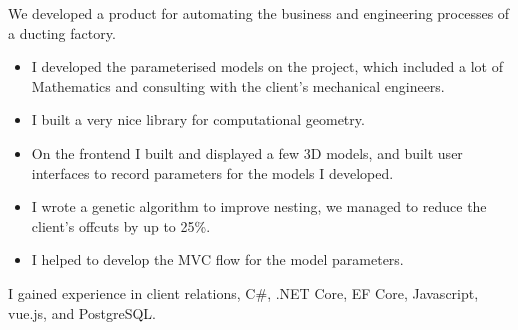 \documentclass[a4paper]{twentysecondcv} %
\begin{document}
\begin{twenty}
    {We developed a product for automating the business and engineering processes of a ducting factory.
    \begin{itemize}
        \item I developed the parameterised models on the project, which included a lot of Mathematics and consulting with the client's mechanical engineers.
        \item I built a very nice library for computational geometry.
        \item On the frontend I built and displayed a few 3D models, and built user interfaces to record parameters for the models I developed.
        \item I wrote a genetic algorithm to improve nesting, we managed to reduce the client's offcuts by up to 25\%.
        \item I helped to develop the MVC flow for the model parameters.
    \end{itemize}
    I gained experience in client relations, C\#, .NET Core, EF Core, Javascript, vue.js, and PostgreSQL.}
\end{twenty}

\newpage %

\makeprofile %
\end{document}
